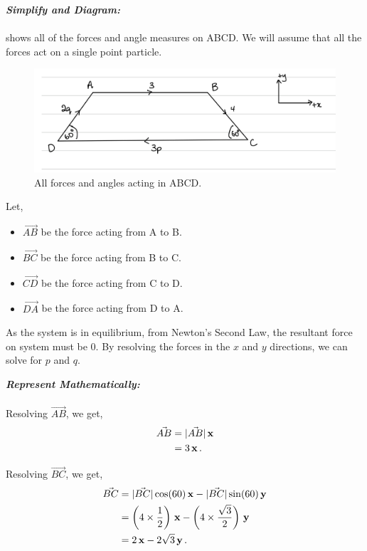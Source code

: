 \begin{subquestions}
\textbf{\textit{Simplify and Diagram:}} \\ \\ 
 shows all of the forces and angle measures on ABCD. We will assume that all the forces act on a single point particle.
\begin{figure}[H]
	\begin{center}
		\includegraphics[scale=0.25]{../2007/figures/2008Mq6Diagram2}
		\caption{\label{2008M:q6:Diagram2} All forces and angles acting in ABCD.}
	\end{center}
\end{figure}

Let,
\begin{itemize}
	\item $\vec{AB}$ be the force acting from A to B.
	\item $\vec{BC}$ be the force acting from B to C.
	\item $\vec{CD}$ be the force acting from C to D.
	\item $\vec{DA}$ be the force acting from D to A.
\end{itemize}

As the system is in equilibrium, from Newton's Second Law, the resultant force on system must be 0. By resolving the forces in the $x$ and $y$ directions, we can solve for $p$ and $q$.




\textbf{\textit{Represent Mathematically:}} \\ \\
Resolving $\vec{AB}$, we get,
\begin{align}
	\vec{AB} & = |\vec{AB}|\,\mathbf{x} \nonumber \\
	         & = 3\,\mathbf{x} \,.
\end{align}

Resolving $\vec{BC}$, we get,
\begin{align}
	\vec{BC} & = |\vec{BC}|\cos(60)\,\mathbf{x} - |\vec{BC}|\sin(60)\,\mathbf{y} \nonumber \\
	         & = \left(4\times \frac{1}{2}\right)\,\mathbf{x} - \left(4\times \frac{\sqrt{3}}{2}\right)\,\mathbf{y} \nonumber \\
	         & = 2 \,\mathbf{x} - 2\sqrt{3}\,\mathbf{y} \,.
\end{align}


\end{subquestions}
